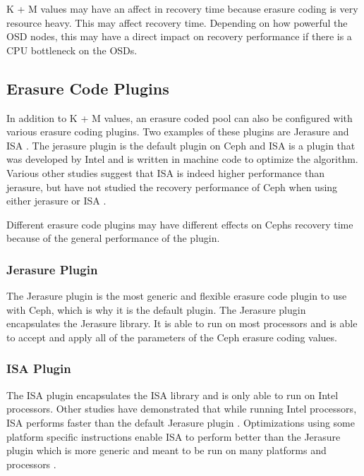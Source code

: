 \documentclass[conference,compsoc]{IEEEtran}
\begin{document}
K + M values may have an affect in recovery time because erasure coding is very resource heavy. This may affect recovery time. Depending on how powerful the OSD nodes, this may have a direct impact on recovery performance if there is a CPU bottleneck on the OSDs. 

\subsection{Erasure Code Plugins}

In addition to K + M values, an erasure coded pool can also be configured with various erasure coding plugins. Two examples of these plugins are Jerasure and ISA \cite{erasure_coded_pools}. The jerasure plugin is the default plugin on Ceph and ISA is a plugin that was developed by Intel and is written in machine code to optimize the algorithm. Various other studies \cite{jerasure_vs_isa} suggest that ISA is indeed higher performance than jerasure, but have not studied the recovery performance of Ceph when using either jerasure or ISA \cite{erasure_coded_pools}. 

Different erasure code plugins may have different effects on Ceph\textquotesingle s recovery time because of the general performance of the plugin. 

\subsubsection{Jerasure Plugin}

The Jerasure plugin is the most generic and flexible erasure code plugin to use with Ceph, which is why it is the default plugin. The Jerasure plugin encapsulates the Jerasure library. It is able to run on most processors and is able to accept and apply all of the parameters of the Ceph erasure coding values. 

\subsubsection{ISA Plugin}

The ISA plugin encapsulates the ISA library and is only able to run on Intel processors. Other studies have demonstrated that while running Intel processors, ISA performs faster than the default Jerasure plugin \cite{jerasure_vs_isa}. Optimizations using some platform specific instructions enable ISA to perform better than the Jerasure plugin which is more generic and meant to be run on many platforms and processors \cite{isa}.
\end{document}
